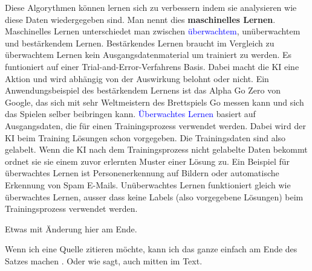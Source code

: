 \documentclass{report}
\begin{document}
Diese Algorythmen können lernen sich zu verbessern indem sie analysieren wie diese Daten wiedergegeben sind. Man nennt dies \textbf{maschinelles Lernen}.
Maschinelles Lernen unterschiedet man zwischen \textcolor{blue}{überwachtem}, unüberwachtem und bestärkendem Lernen. Bestärkendes Lernen braucht im Vergleich zu
überwachtem Lernen kein Ausgangsdatenmaterial um trainiert zu werden. Es funtioniert auf einer Trial-and-Error-Verfahrens Basis. Dabei macht die KI
eine Aktion und wird abhängig von der Auswirkung belohnt oder nicht. Ein Anwendungsbeispiel des bestärkendem Lernens ist das Alpha Go Zero von Google, das 
sich mit sehr Weltmeistern des Brettspiels Go messen kann und sich das Spielen selber beibringen kann.
\textcolor{blue}{Überwachtes Lernen} basiert auf Ausgangsdaten, die für einen Trainingsprozess verwendet werden.\citep{bigdatainsider} Dabei wird der KI beim Training Lösungen  
schon vorgegeben. Die Trainingsdaten sind also gelabelt. Wenn die KI nach dem Trainingsprozess nicht gelabelte Daten bekommt ordnet sie sie einem zuvor erlernten
Muster einer Lösung zu. Ein Beispiel für überwachtes Lernen ist Personenerkennung auf Bildern oder automatische Erkennung von Spam E-Mails.
Unüberwachtes Lernen funktioniert gleich wie überwachtes Lernen, ausser dass keine Labels (also vorgegebene Lösungen) beim Trainingsprozess verwendet werden.



Etwas mit Änderung hier am Ende.

Wenn ich eine Quelle zitieren möchte, kann ich das ganze einfach am Ende des Satzes machen \citep{example}. Oder wie \citet{example} sagt, auch mitten im Text.

\printbibliography
\end{document}
